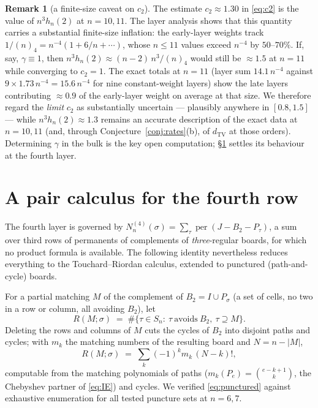 \documentclass[11pt]{article}
\theoremstyle{definition}
\newtheorem{remark}[theorem]{Remark}
\DeclareMathOperator{\per}{per}
\newcommand{\dtv}{d_{\mathrm{TV}}}
\begin{document}
\begin{remark}[a finite-size caveat on $c_2$]\label{rem:c2caveat}
The estimate $c_2\approx1.30$ in \eqref{eq:c2} is the value of $n^3h_n(2)$
at $n=10,11$.  The layer analysis shows that this quantity carries a
substantial finite-size inflation: the early-layer weights track
$1/(n)_4=n^{-4}(1+6/n+\cdots)$, whose $n\le11$ values exceed $n^{-4}$ by
$50\text{--}70\%$.  If, say, $\gamma\equiv1$, then
$n^3h_n(2)\approx (n-2)\,n^3/(n)_4$ would still be $\approx1.5$ at $n=11$
while converging to $c_2=1$.  The exact totals at $n=11$ (layer sum $14.1\,
n^{-4}$ against $9\times1.73\,n^{-4}=15.6\,n^{-4}$ for nine constant-weight
layers) show the late layers contributing $\approx0.9$ of the early-layer
weight on average at that size.  We therefore regard the \emph{limit} $c_2$
as substantially uncertain --- plausibly anywhere in $[0.8,1.5]$ --- while
$n^3h_n(2)\approx1.3$ remains an accurate description of the exact data at
$n=10,11$ (and, through Conjecture~\ref{conj:rates}(b), of
$\dtv$ at those orders).  Determining $\gamma$ in the bulk is the key open
computation; \S\ref{sec:pair} settles its behaviour at the fourth layer.
\end{remark}

\section{A pair calculus for the fourth row}\label{sec:pair}

The fourth layer is governed by
$N^{(4)}_n(\sigma)=\sum_\tau \per(J-B_2-P_\tau)$, a sum over third rows of
permanents of complements of \emph{three}-regular boards, for which no
product formula is available.  The following identity nevertheless reduces
everything to the Touchard--Riordan calculus, extended to punctured
(path-and-cycle) boards.

For a partial matching $M$ of the complement of $B_2=I\cup P_\sigma$ (a set
of cells, no two in a row or column, all avoiding $B_2$), let
\[
R(M;\sigma)\;=\;\#\{\tau\in S_n:\ \tau\ \text{avoids}\ B_2,\ \tau\supseteq M\}.
\]
Deleting the rows and columns of $M$ cuts the cycles of $B_2$ into disjoint
paths and cycles; with $m_k$ the matching numbers of the resulting board and
$N=n-|M|$,
\begin{equation}\label{eq:punctured}
R(M;\sigma)\;=\;\sum_k(-1)^k m_k\,(N-k)! ,
\end{equation}
computable from the matching polynomials of paths
($m_k(P_e)=\binom{e-k+1}{k}$, the Chebyshev partner of \eqref{eq:IE}) and
cycles.  We verified \eqref{eq:punctured} against exhaustive enumeration for
all tested puncture sets at $n=6,7$.
\end{document}
